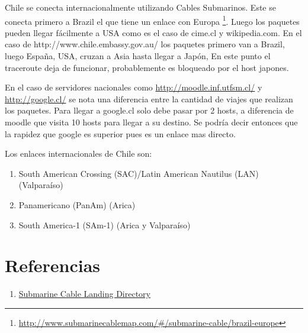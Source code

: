 \documentclass{article}
\begin{document}
    Chile se conecta internacionalmente utilizando Cables Submarinos. Este se conecta primero a Brazil el que tiene un enlace con Europa \footnote{\href{http://www.submarinecablemap.com/\#/submarine-cable/brazil-europe}{http://www.submarinecablemap.com/\#/submarine-cable/brazil-europe}}. Luego los paquetes pueden llegar fácilmente a USA como es el caso de cime.cl y wikipedia.com. En el caso de http://www.chile.embassy.gov.au/ los paquetes primero van a Brazil, luego España, USA, cruzan a Asia hasta llegar a Japón, En este punto el traceroute deja de funcionar, probablemente es bloqueado por el host japones.

    En el caso de servidores nacionales como \href{http://moodle.inf.utfsm.cl/}{http://moodle.inf.utfsm.cl/} y \href{http://google.cl/}{http://google.cl/} se nota una diferencia entre la cantidad de viajes que realizan los paquetes. Para llegar a google.cl solo debe pasar por 2 hosts, a diferencia de moodle que visita 10 hosts para llegar a su destino. Se podría decir entonces que la rapidez que google es superior pues es un enlace mas directo.

    Los enlaces internacionales de Chile son:

    \begin{enumerate}
        \item South American Crossing (SAC)/Latin American Nautilus (LAN) (Valparaíso)
        \item Panamericano (PanAm) (Arica)
        \item South America-1 (SAm-1) (Arica y Valparaíso)
    \end{enumerate}

    \section*{Referencias}

        \begin{enumerate}
            \item \href{http://goo.gl/QFhvU8}{Submarine Cable Landing Directory}
        \end{enumerate}
    
\end{document}
